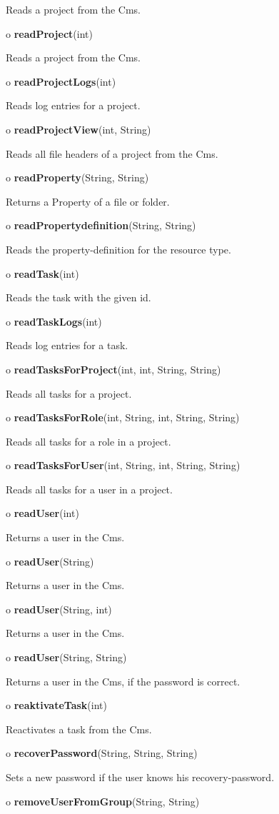 \begin{description}
Reads a project from the Cms.
\item o {\bf readProject}(int)

Reads a project from the Cms.
\item o {\bf readProjectLogs}(int)

Reads log entries for a project.
\item o {\bf readProjectView}(int, String)

Reads all file headers of a project from the Cms.
\item o {\bf readProperty}(String, String)

Returns a Property of a file or folder.
\item o {\bf readPropertydefinition}(String, String)

Reads the property-definition for the resource type.
\item o {\bf readTask}(int)

Reads the task with the given id.
\item o {\bf readTaskLogs}(int)

Reads log entries for a task.
\item o {\bf readTasksForProject}(int, int, String, String)

Reads all tasks for a project.
\item o {\bf readTasksForRole}(int, String, int, String, String)

Reads all tasks for a role in a project.
\item o {\bf readTasksForUser}(int, String, int, String, String)

Reads all tasks for a user in a project.
\item o {\bf readUser}(int)

Returns a user in the Cms.
\item o {\bf readUser}(String)

Returns a user in the Cms.
\item o {\bf readUser}(String, int)

Returns a user in the Cms.
\item o {\bf readUser}(String, String)

Returns a user in the Cms, if the password is correct.
\item o {\bf reaktivateTask}(int)

Reactivates a task from the Cms.
\item o {\bf recoverPassword}(String, String, String)

Sets a new password if the user knows his recovery-password.
\item o {\bf removeUserFromGroup}(String, String)


\end{description}
